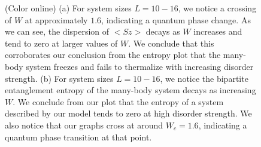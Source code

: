 \documentclass[prl,aps,epsf,showpacs,twocolumn]{revtex4}
\begin{document}
\begin{figure}
  \caption{(Color online) (a) For system sizes $L = 10-16$, we notice a crossing
    of $W$ at approximately $1.6$, indicating a quantum phase change. As we can
    see, the dispersion of $<Sz>$ decays as $W$ increases and tend to zero at
    larger values of $W$. We conclude that this corroborates our conclusion from
    the entropy plot that the many-body system freezes and fails to thermalize
    with increasing disorder strength.  (b) For system sizes $L = 10-16$, we
    notice the bipartite entanglement entropy of the many-body system decays as
    increasing $W$. We conclude from our plot that the entropy of a system
    described by our model tends to zero at high disorder strength. We also
    notice that our graphs cross at around $W_c=1.6$, indicating a quantum phase
    transition at that point.
  }
\label{fig1}
\end{figure}
\end{document}
